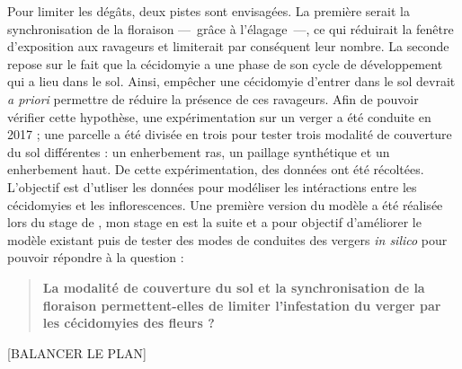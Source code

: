 Pour limiter les dégâts, deux pistes sont envisagées.
La première serait la synchronisation de la floraison ---~grâce à l'élagage~---, ce qui réduirait la fenêtre d'exposition aux ravageurs et limiterait par conséquent leur nombre.
La seconde repose sur le fait que la cécidomyie a une phase de son cycle de développement qui a lieu dans le sol.
Ainsi, empêcher une cécidomyie d'entrer dans le sol devrait \emph{a priori} permettre de réduire la présence de ces ravageurs.
Afin de pouvoir vérifier cette hypothèse, une expérimentation sur un verger a été conduite en 2017 ; une parcelle a été divisée en trois pour tester trois modalité de couverture du sol différentes : un enherbement ras, un paillage synthétique et un enherbement haut. De cette expérimentation, des données ont été récoltées. L'objectif est d'utliser les données pour modéliser les intéractions  entre les cécidomyies et les inflorescences.
Une première version du modèle a été réalisée lors du stage de \citet{laurie}, mon stage en est la suite et a pour objectif d'améliorer le modèle existant puis de tester des modes de conduites des vergers \emph{in silico} pour pouvoir répondre à la question :
\begin{quote}
 \textbf{La modalité de couverture du sol et la synchronisation de la floraison permettent-elles de limiter l'infestation du verger par les cécidomyies des fleurs ?}
\end{quote}

[BALANCER LE PLAN]
